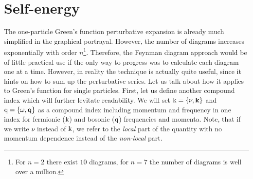 \documentclass[../../main.tex]{subfiles}
\begin{document}
\section{Self-energy}

The one-particle Green's function perturbative expansion is already much simplified in the graphical portrayal. However, the number of diagrams increases exponentially with order $n$\footnote{For $n=2$ there exist $10$ diagrams, for $n=7$ the number of diagrams is well over a million.}. Therefore, the Feynman diagram approach would be of little practical use if the only way to progress was to calculate each diagram one at a time. However, in reality the technique is actually quite useful, since it hints on how to sum up the perturbative series. Let us talk about how it applies to Green's function for single particles. First, let us define another compound index which will further levitate readability. We will set $\text{k}=\{\nu,\textbf{k}\}$ and $\text{q}=\{\omega, \textbf{q}\}$ as a compound index including momentum and frequency in one index for fermionic ($\text{k}$) and bosonic ($\text{q}$) frequencies and momenta. Note, that if we write $\nu$ instead of $\text{k}$, we refer to the \textit{local} part of the quantity with no momentum dependence instead of the \textit{non-local} part.
\end{document}
